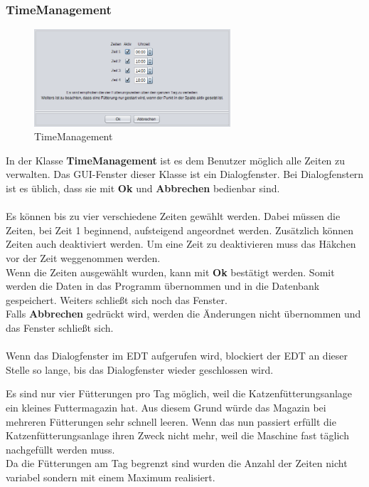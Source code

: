 \subsubsection{TimeManagement}\label{subsubsec:TimeManagement}
\begin{figure}
\vspace{-20pt}
  \begin{center}
    \includegraphics[width=0.65\textwidth]{Bilder/GUI/TimeManagement}
  \end{center}
  \caption{TimeManagement}
  \label{TimeManagement}
  \vspace{0pt}
\end{figure}
In der Klasse \textbf{TimeManagement} ist es dem Benutzer möglich alle Zeiten zu verwalten. Das GUI-Fenster dieser Klasse ist ein Dialogfenster. Bei Dialogfenstern ist es üblich, dass sie mit \textbf{Ok} und \textbf{Abbrechen} bedienbar sind.
\\ \\ Es können bis zu vier verschiedene Zeiten gewählt werden. Dabei müssen die Zeiten, bei Zeit 1 beginnend, aufsteigend angeordnet werden. Zusätzlich können Zeiten auch deaktiviert werden. Um eine Zeit zu deaktivieren muss das Häkchen vor der Zeit weggenommen werden.
\\ Wenn die Zeiten ausgewählt wurden, kann mit \textbf{Ok} bestätigt werden. Somit werden die Daten in das Programm übernommen und in die Datenbank gespeichert. Weiters schließt sich noch das Fenster.
\\ Falls \textbf{Abbrechen} gedrückt wird, werden die Änderungen nicht übernommen und das Fenster schließt sich.
\\ \\ Wenn das Dialogfenster im EDT aufgerufen wird, blockiert der EDT an dieser Stelle so lange, bis das Dialogfenster wieder geschlossen wird.

\vspace{10pt}

Es sind nur vier Fütterungen pro Tag möglich, weil die Katzenfütterungsanlage ein kleines Futtermagazin hat. Aus diesem Grund würde das Magazin bei mehreren Fütterungen sehr schnell leeren. Wenn das nun passiert erfüllt die Katzenfütterungsanlage ihren Zweck nicht mehr, weil die Maschine fast täglich nachgefüllt werden muss.
\\ Da die Fütterungen am Tag begrenzt sind wurden die Anzahl der Zeiten nicht variabel sondern mit einem Maximum realisiert.

